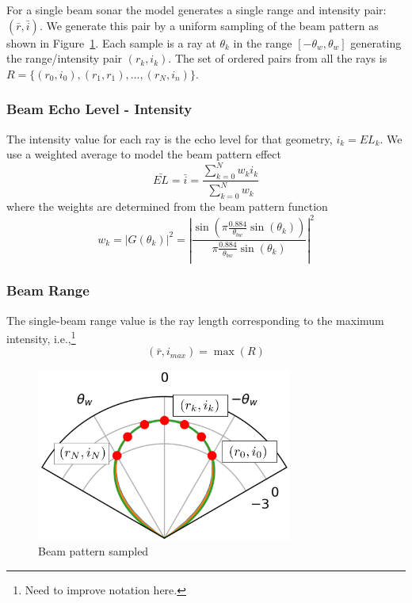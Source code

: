 \documentclass[11pt]{article}
\begin{document}
For a single beam sonar the model generates a single range and intensity pair: $(\bar{r},\bar{i})$.  We generate this pair by a uniform sampling of the beam pattern as shown in Figure~\ref{f:bpsampled}.  Each sample is a ray at $\theta_k$ in the range $[-\theta_w, \theta_w]$ generating the range/intensity pair $(r_k,i_k)$.  The set of ordered pairs from all the rays is $R = \{(r_0,i_0),(r_1,r_1),\ldots,(r_N,i_n)\}$.

\subsubsection{Beam Echo Level - Intensity}

The intensity value for each ray is the echo level for that geometry, $i_k = EL_k$.  We use a weighted average to model the beam pattern effect
\[
\bar{EL} = \bar{i} = \frac{ \sum_{k=0}^{N} w_k i_k }{\sum_{k=0}^N w_k}
\]
where the weights are determined from the beam pattern function
\[
w_k = \left| G(\theta_k) \right|^2 = \left| \frac{\sin(\pi \frac{0.884}{\theta_{bw}} \sin(\theta_k))}{\pi \frac{0.884}{\theta_{bw}} \sin(\theta_k)} \right|^2
\]

\subsubsection{Beam Range}
The single-beam range value is the ray length corresponding to the maximum intensity, i.e.,\footnote{Need to improve notation here.}
\[
(\bar{r},i_{max}) = \max(R)
\]


\begin{figure}[hbt!]
  \centering
  \includegraphics[width=0.75\textwidth]{src/single_beam/single_beam_sampled_annote.png}
  \caption{Beam pattern sampled}
  \label{f:bpsampled}
\end{figure}
\end{document}
